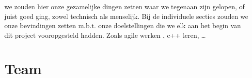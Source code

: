 \begin{tcolorbox}[colback=yellow!30]
  we zouden hier onze gezamelijke dingen zetten waar we tegenaan zijn gelopen, of juist goed ging, zowel technisch als menselijk.
  Bij de individuele secties zouden we onze bevindingen zetten m.b.t. onze doelstellingen die we elk aan het begin van dit project vooropgesteld hadden. Zoals agile werken , c++ leren, \dots

\end{tcolorbox}

\section{Team}




